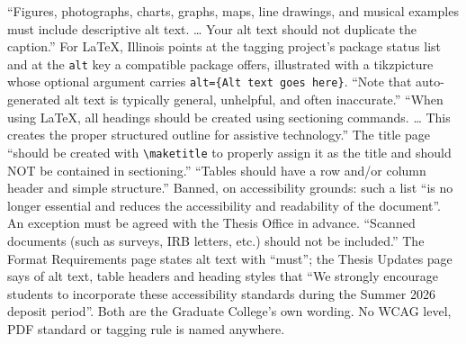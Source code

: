 %
	{``Figures, photographs, charts, graphs, maps, line drawings, and musical
	 examples must include descriptive alt text. \dots{} Your alt text should not
	 duplicate the caption.'' For \LaTeX, Illinois points at the tagging
	 project's package status list and at the \texttt{alt} key a compatible
	 package offers, illustrated with a tikzpicture whose optional argument
	 carries \texttt{alt=\{Alt text goes here\}}. ``Note that auto-generated alt
	 text is typically general, unhelpful, and often inaccurate.''}
	{``When using \LaTeX, all headings should be created using sectioning
	 commands. \dots{} This creates the proper structured outline for assistive
	 technology.'' The title page ``should be created with
	 \texttt{\textbackslash{}maketitle} to properly assign it as the title and
	 should NOT be contained in sectioning.''}
	{``Tables should have a row and/or column header and simple structure.''}
	{Banned, on accessibility grounds: such a list ``is no longer essential and
	 reduces the accessibility and readability of the document''. An exception
	 must be agreed with the Thesis Office in advance.}
	{``Scanned documents (such as surveys, IRB letters, etc.) should not be
	 included.''}
	{The Format Requirements page states alt text with ``must''; the Thesis
	 Updates page says of alt text, table headers and heading styles that ``We
	 strongly encourage students to incorporate these accessibility standards
	 during the Summer 2026 deposit period''. Both are the Graduate College's
	 own wording. No WCAG level, PDF standard or tagging rule is named anywhere.}

